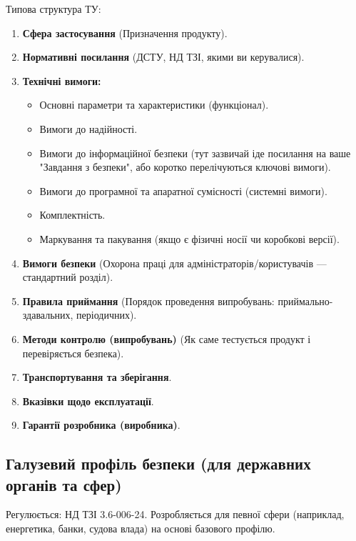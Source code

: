 \documentclass{article}
\begin{document}
Типова структура ТУ:
\begin{enumerate}
    \item \textbf{Сфера застосування} (Призначення продукту).
    \item \textbf{Нормативні посилання} (ДСТУ, НД ТЗІ, якими ви керувалися).
    \item \textbf{Технічні вимоги:}
    \begin{itemize}
        \item Основні параметри та характеристики (функціонал).
        \item Вимоги до надійності.
        \item Вимоги до інформаційної безпеки (тут зазвичай іде посилання на ваше "Завдання з безпеки", або коротко перелічуються ключові вимоги).
        \item Вимоги до програмної та апаратної сумісності (системні вимоги).
        \item Комплектність.
        \item Маркування та пакування (якщо є фізичні носії чи коробкові версії).
    \end{itemize}
    \item \textbf{Вимоги безпеки} (Охорона праці для адміністраторів/користувачів — стандартний розділ).
    \item \textbf{Правила приймання} (Порядок проведення випробувань: приймально-здавальних, періодичних).
    \item \textbf{Методи контролю (випробувань)} (Як саме тестується продукт і перевіряється безпека).
    \item \textbf{Транспортування та зберігання}.
    \item \textbf{Вказівки щодо експлуатації}.
    \item \textbf{Гарантії розробника (виробника)}.
\end{enumerate}

\subsection{Галузевий профіль безпеки (для державних органів та сфер)}

Регулюється: НД ТЗІ 3.6-006-24. Розробляється для певної сфери (наприклад, енергетика, банки, судова влада) на основі базового профілю.
\end{document}
